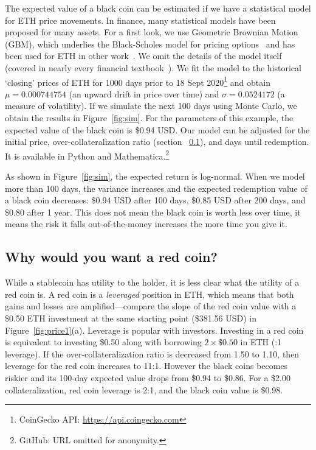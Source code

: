 The expected value of a black coin can be estimated if we have a statistical model for ETH price movements. In finance, many statistical models have been proposed for many assets. For a first look, we use Geometric Brownian Motion (GBM), which underlies the Black-Scholes model for pricing options~\cite{BS73} and has been used for ETH in other work~\cite{GPH+20}. We omit the details of the model itself (covered in nearly every  financial textbook~\cite{Sey09}). We fit the model to the historical `closing' prices of ETH for 1000 days prior to 18 Sept 2020\footnote{CoinGecko API: \url{https://api.coingecko.com}} and obtain $\mu=0.000744754$ (an upward drift in price over time) and $\sigma=0.0524172$ (a measure of volatility). If we simulate the next 100 days using Monte Carlo, we obtain the results in Figure~\ref{fig:sim}. For the parameters of this example, the expected value of the black coin is \$0.94 USD. Our model can be adjusted for the initial price, over-collateralization ratio (section ~\ref{sec:redchar}), and days until redemption. It is available in Python and Mathematica.\footnote{GitHub: URL omitted for anonymity.} 

As shown in Figure~\ref{fig:sim}, the expected return is log-normal. When we model more than 100 days, the variance increases and the expected redemption value of a black coin decreases: \$0.94 USD after 100 days, \$0.85 USD after 200 days, and \$0.80 after 1 year. This does not mean the black coin is worth less over time, it means the risk it falls out-of-the-money increases the more time you give it. 


\subsection{Why would you want a red coin?}
\label{sec:redchar}

While a stablecoin has utility to the holder, it is less clear what the utility of a red coin is. A red coin is a \textit{leveraged} position in ETH, which means that both gains and losses are amplified---compare the slope of the red coin value with a \$0.50 ETH investment at the same starting point (\$381.56 USD) in Figure~\ref{fig:price1}(a). Leverage is popular with investors. Investing in a red coin is equivalent to investing \$0.50 along with borrowing $2\times\$0.50$ in ETH (:1 leverage). If the over-collateralization ratio is decreased from 1.50 to 1.10, then leverage for the red coin increases to 11:1. However the black coins becomes riskier and its 100-day expected value drops from \$0.94 to \$0.86. For a \$2.00 collateralization, red coin leverage is 2:1, and the black coin value is \$0.98. 

